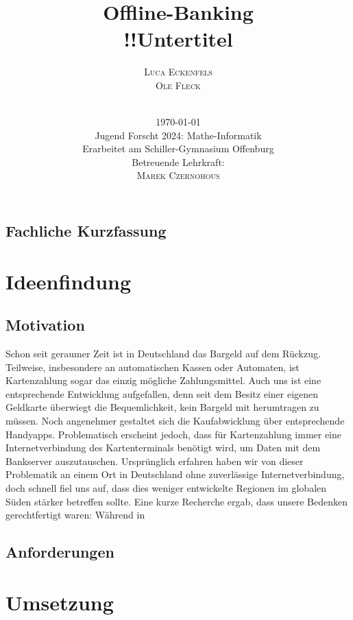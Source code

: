 \documentclass[a4paper,12pt,ngerman]{scrreport}
\title{Offline-Banking\\
    \vspace{6mm}
    \large{!!Untertitel}}
\author{\Large{\textsc{Luca Eckenfels}}\\\textsc{Ole Fleck}\\
    \vspace{5cm}\\
\date{\today\\\vspace{12mm}
Jugend Forscht 2024: Mathe-Informatik\\\vspace{6mm}
    Erarbeitet am Schiller-Gymnasium Offenburg\\
Betreuende Lehrkraft: \\\textsc{Marek Czernohous}}
}
\begin{document}


    \maketitle
    \tableofcontents
    \newpage
    \section*{Fachliche Kurzfassung}

    \chapter{Ideenfindung}\label{ch:einleitung}
    \section{Motivation}
    Schon seit geraumer Zeit ist in Deutschland das Bargeld auf dem Rückzug.
    Teilweise, insbesondere an automatischen Kassen oder Automaten, ist Kartenzahlung sogar das einzig mögliche Zahlungsmittel.
    Auch uns ist eine entsprechende Entwicklung aufgefallen, denn seit dem Besitz einer eigenen Geldkarte überwiegt die Bequemlichkeit, kein Bargeld mit herumtragen zu müssen.
    Noch angenehmer gestaltet sich die Kaufabwicklung über entsprechende Handyapps.
    Problematisch erscheint jedoch, dass für Kartenzahlung immer eine Internetverbindung des Kartenterminals benötigt wird, um Daten mit dem Bankserver auszutauschen.
    Ursprünglich erfahren haben wir von dieser Problematik an einem Ort in Deutschland ohne zuverlässige Internetverbindung, doch schnell fiel uns auf, dass dies weniger entwickelte Regionen im globalen Süden stärker betreffen sollte.
    Eine kurze Recherche ergab, dass unsere Bedenken gerechtfertigt waren:
    Während in

    \section{Anforderungen}

    \chapter{Umsetzung}\label{ch:umsetzung}
\end{document}

